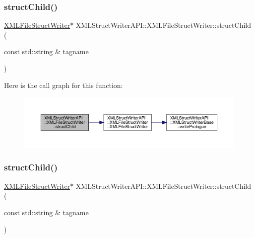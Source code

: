 \subsubsection{\texorpdfstring{structChild()}{structChild()}\hspace{0.1cm}{\footnotesize\ttfamily [2/3]}}
{\footnotesize\ttfamily \mbox{\hyperlink{classXMLStructWriterAPI_1_1XMLFileStructWriter}{X\+M\+L\+File\+Struct\+Writer}}$\ast$ X\+M\+L\+Struct\+Writer\+A\+P\+I\+::\+X\+M\+L\+File\+Struct\+Writer\+::struct\+Child (\begin{DoxyParamCaption}\item[{const std\+::string \&}]{tagname }\end{DoxyParamCaption})\hspace{0.3cm}{\ttfamily [inline]}}

Here is the call graph for this function\+:
\nopagebreak
\begin{figure}[H]
\begin{center}
\leavevmode
\includegraphics[width=350pt]{db/de3/classXMLStructWriterAPI_1_1XMLFileStructWriter_a29ff0f4353991294bab0c75ab8895f73_cgraph}
\end{center}
\end{figure}
\mbox{\label{classXMLStructWriterAPI_1_1XMLFileStructWriter_a29ff0f4353991294bab0c75ab8895f73}} 
\subsubsection{\texorpdfstring{structChild()}{structChild()}\hspace{0.1cm}{\footnotesize\ttfamily [3/3]}}
{\footnotesize\ttfamily \mbox{\hyperlink{classXMLStructWriterAPI_1_1XMLFileStructWriter}{X\+M\+L\+File\+Struct\+Writer}}$\ast$ X\+M\+L\+Struct\+Writer\+A\+P\+I\+::\+X\+M\+L\+File\+Struct\+Writer\+::struct\+Child (\begin{DoxyParamCaption}\item[{const std\+::string \&}]{tagname }\end{DoxyParamCaption})\hspace{0.3cm}{\ttfamily [inline]}}

